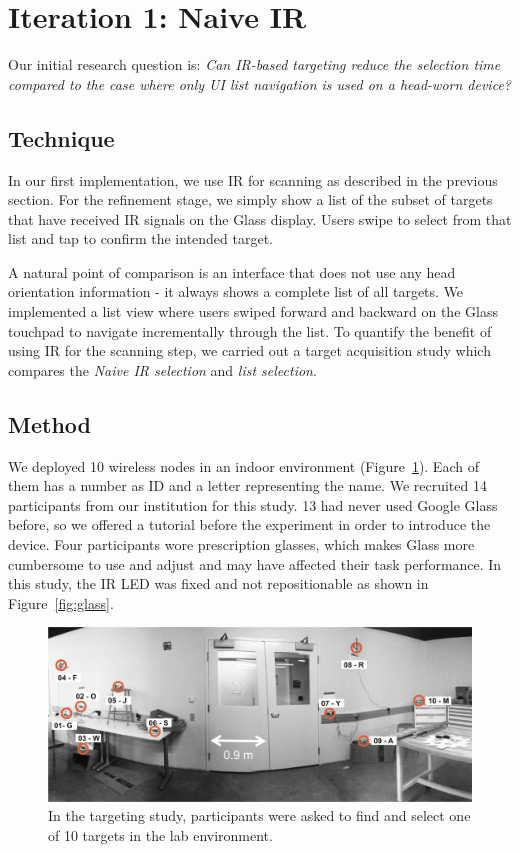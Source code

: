 
\section{Iteration 1: Naive IR}
Our initial research question is: {\em Can IR-based targeting reduce the selection time compared to the case where only UI list navigation is used on a head-worn device?} 

\subsection{Technique}
In our first implementation, we use IR for scanning as described in the previous section. For the refinement stage, we simply show a list of the subset of targets that have received IR signals on the Glass display. Users swipe to select from that list and tap to confirm the intended target.

A natural point of comparison is an interface that does not use any head orientation information - it always shows a complete list of all targets. We implemented a list view where users swiped forward and backward on the Glass touchpad to navigate incrementally through the list. To quantify the benefit of using IR for the scanning step, we carried out a target acquisition study which compares the {\em Naive IR selection} and {\em list selection}.  

\subsection{Method}
We deployed 10 wireless nodes in an indoor environment (Figure~\ref{fig:targeting-study-layout}). Each of them has a number as ID and a letter representing the name. We recruited 14 participants from our institution for this study. 13 had never used Google Glass before, so we offered a tutorial before the experiment in order to introduce the device. Four participants wore prescription glasses, which makes Glass more cumbersome to use and adjust and may have affected their task performance. In this study, the IR LED was fixed and not repositionable as shown in Figure~\ref{fig:glass}.

\begin{figure}[t]
\centering
\includegraphics[width=0.9\columnwidth]{figures/study-layout1.png}
\caption{In the targeting study, participants were asked to find and select one of 10 targets in the lab environment.}
\label{fig:targeting-study-layout}
\end{figure}


